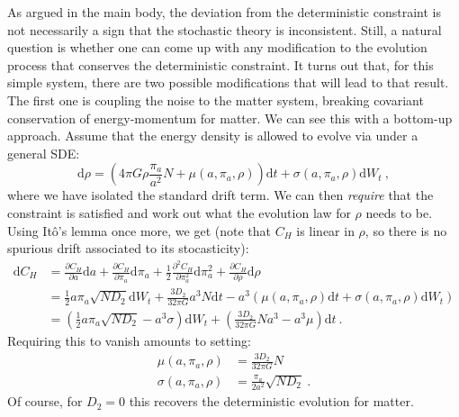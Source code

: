 \documentclass[amsmath,amssymb,11pt]{article}
\begin{document}
As argued in the main body, the deviation from the deterministic constraint is not necessarily a sign that the stochastic theory is inconsistent. Still, a natural question is whether one can come up with any modification to the evolution process that conserves the deterministic constraint. It turns out that, for this simple system, there are two possible modifications that will lead to that result. The first one is coupling the noise to the matter system, breaking covariant conservation of energy-momentum for matter. We can see this with a bottom-up approach. Assume that the energy density is allowed to evolve via under a general SDE:
\begin{equation}
    \text{d}\rho = \left(4\pi G\rho \frac{\pi_a}{a^2}N+\mu(a,\pi_a,\rho) \right)\text{d}t + \sigma(a,\pi_a,\rho) \text{d}W_t \ ,
\end{equation}
where we have isolated the standard drift term. We can then \textit{require} that the constraint is satisfied and work out what the evolution law for $\rho$ needs to be. Using It\^{o}'s lemma once more, we get (note that $C_H$ is linear in $\rho$, so there is no spurious drift associated to its stocasticity):
\begin{equation}
\begin{split}
    \text{d}C_H &= \frac{\partial C_H}{\partial a} \text{d}a +  \frac{\partial C_H}{\partial \pi_a} \text{d} \pi_a + \frac{1}{2} \frac{\partial^2 C_H}{\partial \pi_a^2}  \text{d}\pi_a^2 + \frac{\partial C_H}{\partial \rho} \text{d}\rho \\
    &= \frac{1}{2}  a \pi_a \sqrt{N D_2}\text{d}W_t+\frac{3D_2 }{32\pi G} a^3 N\text{d}t  - a^3 \left(\mu(a,\pi_a,\rho) \text{d}t +\sigma(a,\pi_a,\rho) \text{d}W_t \right)   \\
    &= \left( \frac{1}{2}  a \pi_a \sqrt{N D_2}  - a^3 \sigma \right)\text{d}W_t + \left(\frac{3 D_2}{32\pi G}N a^3 -a^3 \mu\right) \text{d}t  \ .
\end{split}
\end{equation}
Requiring this to vanish amounts to setting:
\begin{align}
    \mu(a,\pi_a,\rho) &= \frac{3 D_2}{32\pi G}N  \\
    \sigma(a,\pi_a,\rho) &= \frac{\pi_a}{2a^2}   \sqrt{N D_2} \ .
\end{align}
Of course, for $D_2=0$ this recovers the deterministic evolution for matter.


\end{document}
